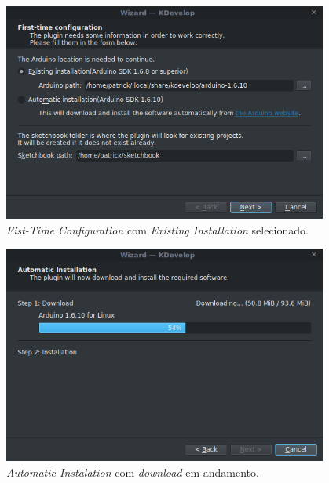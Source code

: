 \begin{figure}[!htb]
  \centering
  \caption[Fist-Time Configuration]{\textit{Fist-Time Configuration} com \textit{Existing Installation} selecionado.}
  \label{fig:kdevelopinstaller1}
  \includegraphics[width=0.95\textwidth]{figuras/kdevelopInstaller1.png}
\end{figure}

\begin{figure}[!htb]
  \centering
  \caption[Automatic Instalation executando Download]{\textit{Automatic Instalation} com \textit{download} em andamento.}
  \label{fig:kdevelopinstaller21}
  \includegraphics[width=0.95\textwidth]{figuras/kdevelopInstaller21.png}
\end{figure}

